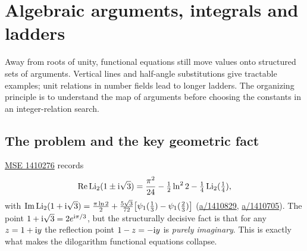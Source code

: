\chapter{Algebraic arguments, integrals and ladders}
\label{ch:03-algebraic}

Away from roots of unity, functional equations still move values onto
structured sets of arguments. Vertical lines and half-angle substitutions give
tractable examples; unit relations in number fields lead to longer ladders.
The organizing principle is to understand the map of arguments before choosing
the constants in an integer-relation search.

\section{The problem and the key geometric fact}
\href{https://math.stackexchange.com/q/1410276}{MSE 1410276} records
\begin{equation}\label{vertical:eq:mse}
  \operatorname{Re}\operatorname{Li}_2(1\pm\mathrm{i}\sqrt3)=\frac{\pi^2}{24}-\tfrac12\ln^2 2-\tfrac14\operatorname{Li}_2(\tfrac14),
\end{equation}
with $\operatorname{Im}\operatorname{Li}_2(1+\mathrm{i}\sqrt3)=\tfrac{\pi\ln2}{2}+\tfrac{5\sqrt3}{72}\bigl[\psi_1(\tfrac13)-\psi_1(\tfrac23)\bigr]$
(\href{https://math.stackexchange.com/a/1410829}{a/1410829}, \href{https://math.stackexchange.com/a/1410705}{a/1410705}).
The point $1+\mathrm{i}\sqrt3=2e^{\mathrm{i}\pi/3}$, but the structurally decisive fact is that for any $z=1+\mathrm{i} y$ the
reflection point $1-z=-\mathrm{i} y$ is \emph{purely imaginary}. This is exactly what makes the dilogarithm
functional equations collapse.

